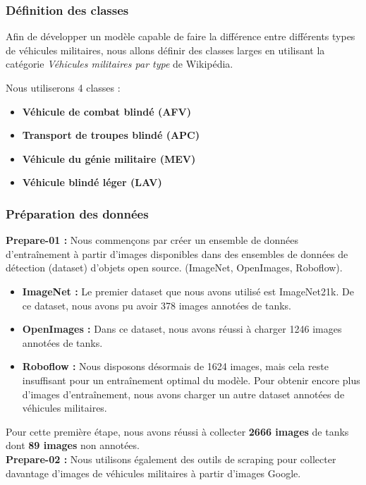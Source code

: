 \subsubsection{Définition des classes}

Afin de développer un modèle capable de faire la différence entre différents types de véhicules militaires, nous allons définir des classes larges en utilisant la catégorie \textit{Véhicules militaires par type} de Wikipédia.

Nous utiliserons 4 classes :

\begin{itemize}
	\item \textbf{Véhicule de combat blindé (AFV)}
	\item \textbf{Transport de troupes blindé (APC)}
	\item \textbf{Véhicule du génie militaire (MEV)}
	\item \textbf{Véhicule blindé léger (LAV)}
\end{itemize}

\subsubsection{Préparation des données}

\indent \textbf{Prepare-01 :} Nous commençons par créer un ensemble de données d'entraînement à partir d'images disponibles dans des ensembles de données de détection (dataset) d'objets open source. (ImageNet, OpenImages, Roboflow).

\begin{itemize}
	\item \textbf{ImageNet : }Le premier dataset que nous avons utilisé est ImageNet21k. De ce dataset, nous avons pu avoir 378 images annotées de tanks.
	\item \textbf{OpenImages : } Dans ce dataset, nous avons réussi à charger 1246 images annotées de tanks.
	\item \textbf{Roboflow : } Nous disposons désormais de 1624 images, mais cela reste insuffisant pour un entraînement optimal du modèle. Pour obtenir encore plus d'images d'entraînement, nous avons charger un autre dataset annotées de véhicules militaires.
\end{itemize}

\noindent Pour cette première étape, nous avons réussi à collecter \textbf{2666 images} de tanks dont \textbf{89 images} non annotées.\\


\noindent\textbf{Prepare-02 :} Nous utilisons également des outils de scraping pour collecter davantage d'images de véhicules militaires à partir d'images Google.

